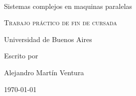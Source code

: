 \documentclass[9pt, a4paper,english,spanish]{amsart}
\begin{document}
\makeatletter
\preto{\@verbatim}{\topsep=0pt \partopsep=0pt }
\makeatother

\begin{center}
~\\ ~\\ ~\\ ~\\ ~\\ ~\\ 
{\LARGE Sistemas complejos en maquinas paralelas}%
\vspace*{1\baselineskip}

\scshape %
Trabajo práctico de fin de cursada

\vspace*{1\baselineskip}
Universidad de Buenos Aires\\[\baselineskip]


\vspace*{5\baselineskip} 

Escrito por \\[\baselineskip]
{\Large Alejandro Martín Ventura\par} 

\vspace*{1\baselineskip}
\today

\end{center}
\newpage

\tableofcontents

\newpage










\end{document}
